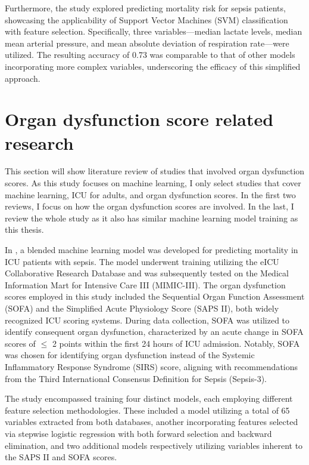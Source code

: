 \documentclass[12pt,a4paper,english
]{tunithesis}
\begin{document}
Furthermore, the study explored predicting mortality risk for sepsis patients, showcasing the applicability of Support Vector Machines (SVM) classification with feature selection. Specifically, three variables—median lactate levels, median mean arterial pressure, and mean absolute deviation of respiration rate—were utilized. The resulting accuracy of 0.73 was comparable to that of other models incorporating more complex variables, underscoring the efficacy of this simplified approach.

 

\section{Organ dysfunction score related research}
This section will show literature review of studies that involved organ dysfunction scores. As this study focuses on machine learning, I only select studies that cover machine learning, ICU for adults, and organ dysfunction scores. In the first two reviews, I focus on how the organ dysfunction scores are involved. In the last, I review the whole study as it also has similar machine learning model training as this thesis.

In \textcite{zeng2021}, a blended machine learning model was developed for predicting mortality in ICU patients with sepsis. The model underwent training utilizing the eICU Collaborative Research Database and was subsequently tested on the Medical Information Mart for Intensive Care III (MIMIC-III). The organ dysfunction scores employed in this study included the Sequential Organ Function Assessment (SOFA) and the Simplified Acute Physiology Score (SAPS II), both widely recognized ICU scoring systems. During data collection, SOFA was utilized to identify consequent organ dysfunction, characterized by an acute change in SOFA scores of $\leq$ 2 points within the first 24 hours of ICU admission. Notably, SOFA was chosen for identifying organ dysfunction instead of the Systemic Inflammatory Response Syndrome (SIRS) score, aligning with recommendations from the Third International Consensus Definition for Sepsis (Sepsis-3).

The study encompassed training four distinct models, each employing different feature selection methodologies. These included a model utilizing a total of 65 variables extracted from both databases, another incorporating features selected via stepwise logistic regression with both forward selection and backward elimination, and two additional models respectively utilizing variables inherent to the SAPS II and SOFA scores.
\end{document}
